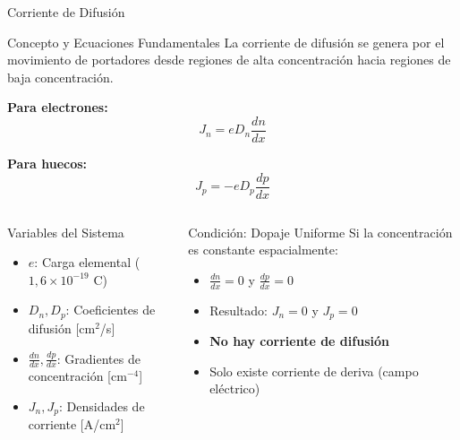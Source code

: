 \documentclass[
    10pt,
    aspectratio=169,
    xcolor={dvipsnames},
    spanish,
    ]{beamer}
\begin{document}
\begin{frame}{Corriente de Difusión}
\begin{block}{Concepto y Ecuaciones Fundamentales}
  \footnotesize
  La corriente de difusión se genera por el movimiento de portadores desde regiones de alta concentración hacia regiones de baja concentración.
  
  \vspace{0.2cm}
  \textbf{Para electrones:}
  \begin{equation}
    J_n = eD_n \frac{dn}{dx}
  \end{equation}
  
  \textbf{Para huecos:}
  \begin{equation}
    J_p = -eD_p \frac{dp}{dx}
  \end{equation}
\end{block}

\begin{columns}
  \begin{column}{0.48\textwidth}
    \begin{block}{Variables del Sistema}
      \scriptsize
      \begin{itemize}
        \item $e$: Carga elemental ($1{,}6 \times 10^{-19}$ C)
        \item $D_n, D_p$: Coeficientes de difusión [cm$^2$/s]
        \item $\frac{dn}{dx}, \frac{dp}{dx}$: Gradientes de concentración [cm$^{-4}$]
        \item $J_n, J_p$: Densidades de corriente [A/cm$^2$]
      \end{itemize}
    \end{block}
  \end{column}
  
  \begin{column}{0.48\textwidth}
    \begin{block}{Condición: Dopaje Uniforme}
      \scriptsize
      Si la concentración es constante espacialmente:
      \begin{itemize}
        \item $\frac{dn}{dx} = 0$ y $\frac{dp}{dx} = 0$
        \item Resultado: $J_n = 0$ y $J_p = 0$
        \item \textbf{No hay corriente de difusión}
        \item Solo existe corriente de deriva (campo eléctrico)
      \end{itemize}
    \end{block}
  \end{column}
\end{columns}
\end{frame}
\end{document}
